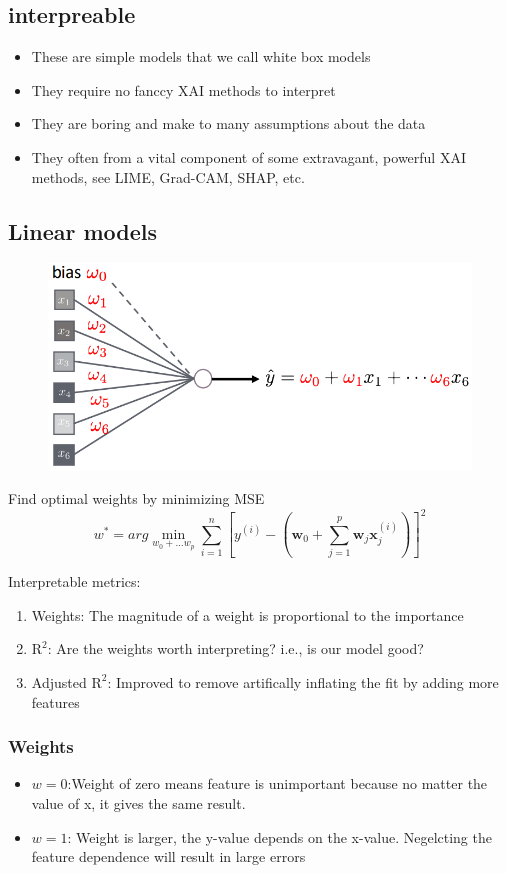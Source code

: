 \subsection{interpreable}
\begin{itemize}
    \item These are simple models that we call white box models
    \item They require no fanccy XAI methods to interpret
    \item They are boring and make to many assumptions about the data
    \item They often from a vital component of some extravagant, powerful XAI methods, see LIME, Grad-CAM, SHAP, etc.
\end{itemize}
\subsection{Linear models}
\begin{figure}
    \includegraphics[width = 0.8\columnwidth]{figures/XAI1/LinearModels.png}
\end{figure}
Find optimal weights by minimizing MSE
\[
w^* = arg \min_{w_0 + \dots w_p}\sum_{i = 1}^{n}\left[y^{(i)}-\left(\mathbf{w}_0 + \sum_{j = 1}^{p}\mathbf{w}_j\mathbf{x}_j^{(i)}\right)\right]^2
\]

Interpretable metrics:
\begin{enumerate}
    \item Weights: The magnitude of a weight is proportional to the importance
    \item \(\text{R}^2\): Are the weights worth interpreting? i.e., is our model good?
    \item Adjusted \(\text{R}^2\): Improved to remove artifically inflating the fit by adding more features
\end{enumerate}
\subsubsection{Weights}
\begin{itemize}
    \item \(w = 0\):Weight of zero  means feature is unimportant because no matter the value of x, it gives the same result.
    \item \(w = 1\): Weight is larger, the y-value depends on the x-value. Negelcting the feature dependence will result in large errors
\end{itemize}
